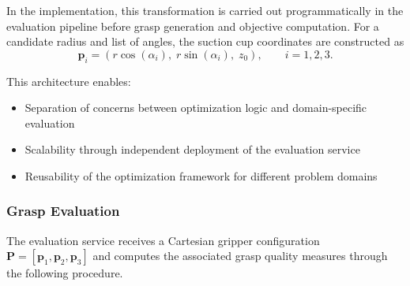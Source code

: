 In the implementation, this transformation is carried out programmatically in the evaluation
pipeline before grasp generation and objective computation. For a candidate radius and list of
angles, the suction cup coordinates are constructed as
\begin{equation}
    \mathbf{p}_i = \left(r\cos(\alpha_i),\; r\sin(\alpha_i),\; z_0\right),
    \qquad i=1,2,3.
\end{equation}

This architecture enables:
\begin{itemize}
    \item Separation of concerns between optimization logic and domain-specific evaluation
    \item Scalability through independent deployment of the evaluation service
    \item Reusability of the optimization framework for different problem domains
\end{itemize}

\subsubsection{Grasp Evaluation}
\label{sec:grasp_eval_sc}

The evaluation service receives a Cartesian gripper configuration
$\mathbf{P} = [\mathbf{p}_1,\mathbf{p}_2,\mathbf{p}_3]$ and computes the associated grasp quality
measures through the following procedure.

